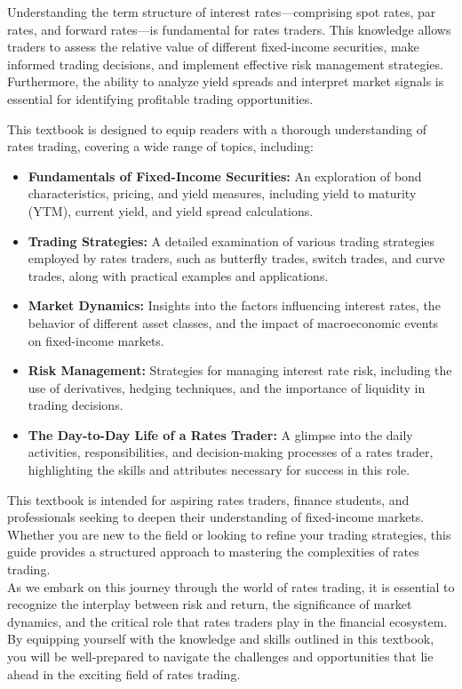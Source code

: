 \documentclass{article}
\begin{document}
 \hspace{2em}
Understanding the term structure of interest rates—comprising spot rates, par rates, and forward rates—is fundamental for rates traders. This knowledge allows traders to assess the relative value of different fixed-income securities, make informed trading decisions, and implement effective risk management strategies. Furthermore, the ability to analyze yield spreads and interpret market signals is essential for identifying profitable trading opportunities.


This textbook is designed to equip readers with a thorough understanding of rates trading, covering a wide range of topics, including:

\begin{itemize}
    \item \textbf{Fundamentals of Fixed-Income Securities:} An exploration of bond characteristics, pricing, and yield measures, including yield to maturity (YTM), current yield, and yield spread calculations.
    \item \textbf{Trading Strategies:} A detailed examination of various trading strategies employed by rates traders, such as butterfly trades, switch trades, and curve trades, along with practical examples and applications.
    \item \textbf{Market Dynamics:} Insights into the factors influencing interest rates, the behavior of different asset classes, and the impact of macroeconomic events on fixed-income markets.
    \item \textbf{Risk Management:} Strategies for managing interest rate risk, including the use of derivatives, hedging techniques, and the importance of liquidity in trading decisions.
    \item \textbf{The Day-to-Day Life of a Rates Trader:} A glimpse into the daily activities, responsibilities, and decision-making processes of a rates trader, highlighting the skills and attributes necessary for success in this role.
\end{itemize}


This textbook is intended for aspiring rates traders, finance students, and professionals seeking to deepen their understanding of fixed-income markets. Whether you are new to the field or looking to refine your trading strategies, this guide provides a structured approach to mastering the complexities of rates trading.\\



As we embark on this journey through the world of rates trading, it is essential to recognize the interplay between risk and return, the significance of market dynamics, and the critical role that rates traders play in the financial ecosystem. By equipping yourself with the knowledge and skills outlined in this textbook, you will be well-prepared to navigate the challenges and opportunities that lie ahead in the exciting field of rates trading.
\end{document}
